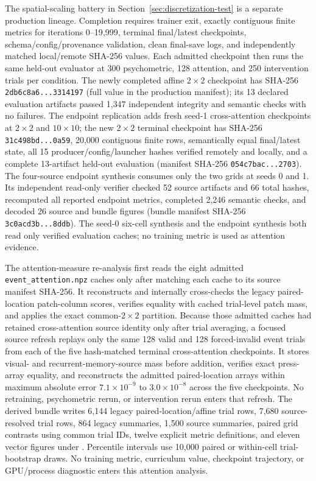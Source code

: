 \documentclass[10pt]{article}
\begin{document}
The spatial-scaling battery in Section~\ref{sec:discretization-test} is a separate production lineage. Completion requires trainer exit, exactly contiguous finite metrics for iterations 0--19{,}999, terminal final/latest checkpoints, schema/config/provenance validation, clean final-save logs, and independently matched local/remote SHA-256 values. Each admitted checkpoint then runs the same held-out evaluator at 300 psychometric, 128 attention, and 250 intervention trials per condition. The newly completed affine $2\times2$ checkpoint has SHA-256 \texttt{2db6c8a6...3314197} (full value in the production manifest); its 13 declared evaluation artifacts passed 1{,}347 independent integrity and semantic checks with no failures. The endpoint replication adds fresh seed-1 cross-attention checkpoints at $2\times2$ and $10\times10$; the new $2\times2$ terminal checkpoint has SHA-256 \texttt{31c498bd...0a59}, 20{,}000 contiguous finite rows, semantically equal final/latest state, all 15 producer/config/launcher hashes verified remotely and locally, and a complete 13-artifact held-out evaluation (manifest SHA-256 \texttt{054c7bac...2703}). The four-source endpoint synthesis consumes only the two grids at seeds 0 and 1. Its independent read-only verifier checked 52 source artifacts and 66 total hashes, recomputed all reported endpoint metrics, completed 2{,}246 semantic checks, and decoded 26 source and bundle figures (bundle manifest SHA-256 \texttt{3c0acd3b...8ddb}). The seed-0 six-cell synthesis and the endpoint synthesis both read only verified evaluation caches; no training metric is used as attention evidence.

The attention-measure re-analysis first reads the eight admitted \texttt{event\_attention.npz} caches only after matching each cache to its source manifest SHA-256. It reconstructs and internally cross-checks the legacy paired-location patch-column scores, verifies equality with cached trial-level patch mass, and applies the exact common-$2\times2$ partition. Because those admitted caches had retained cross-attention source identity only after trial averaging, a focused source refresh replays only the same 128 valid and 128 forced-invalid event trials from each of the five hash-matched terminal cross-attention checkpoints. It stores visual- and recurrent-memory-source mass before addition, verifies exact press-array equality, and reconstructs the admitted paired-location arrays within maximum absolute error $7.1\times10^{-9}$ to $3.0\times10^{-8}$ across the five checkpoints. No retraining, psychometric rerun, or intervention rerun enters that refresh. The derived bundle writes 6{,}144 legacy paired-location/affine trial rows, 7{,}680 source-resolved trial rows, 864 legacy summaries, 1{,}500 source summaries, paired grid contrasts using common trial IDs, twelve explicit metric definitions, and eleven vector figures under . Percentile intervals use 10{,}000 paired or within-cell trial-bootstrap draws. No training metric, curriculum value, checkpoint trajectory, or GPU/process diagnostic enters this attention analysis.
\end{document}
